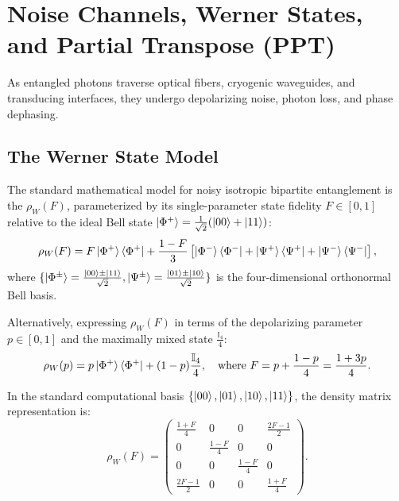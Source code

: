 \section{Noise Channels, Werner States, and Partial Transpose (PPT)}
\label{sec:werner_states}

As entangled photons traverse optical fibers, cryogenic waveguides, and transducing interfaces, they undergo depolarizing noise, photon loss, and phase dephasing.

\subsection{The Werner State Model}
The standard mathematical model for noisy isotropic bipartite entanglement is the  $\rho_W(F)$, parameterized by its single-parameter state fidelity $F \in [0, 1]$ relative to the ideal Bell state $\ket{\Phi^+} = \frac{1}{\sqrt{2}}(\ket{00} + \ket{11})$:
\begin{equation}
    \rho_W(F) = F \ket{\Phi^+}\bra{\Phi^+} + \frac{1 - F}{3} \left[ \ket{\Phi^-}\bra{\Phi^-} + \ket{\Psi^+}\bra{\Psi^+} + \ket{\Psi^-}\bra{\Psi^-} \right],
    \label{eq:werner_state_bell_basis}
\end{equation}
where $\{\ket{\Phi^\pm} = \frac{\ket{00}\pm\ket{11}}{\sqrt{2}}, \ket{\Psi^\pm} = \frac{\ket{01}\pm\ket{10}}{\sqrt{2}}\}$ is the four-dimensional orthonormal Bell basis.

Alternatively, expressing $\rho_W(F)$ in terms of the depolarizing parameter $p \in [0, 1]$ and the maximally mixed state $\frac{\mathbb{I}_4}{4}$:
\begin{equation}
    \rho_W(p) = p \ket{\Phi^+}\bra{\Phi^+} + (1 - p) \frac{\mathbb{I}_4}{4}, \quad \text{where } F = p + \frac{1 - p}{4} = \frac{1 + 3p}{4}.
    \label{eq:werner_state_depolarizing}
\end{equation}

In the standard computational basis $\{\ket{00}, \ket{01}, \ket{10}, \ket{11}\}$, the density matrix representation is:
\begin{equation}
    \rho_W(F) = \begin{pmatrix}
        \frac{1+F}{4} & 0 & 0 & \frac{2F-1}{2} \\
        0 & \frac{1-F}{4} & 0 & 0 \\
        0 & 0 & \frac{1-F}{4} & 0 \\
        \frac{2F-1}{2} & 0 & 0 & \frac{1+F}{4}
    \end{pmatrix}.
    \label{eq:werner_matrix_representation}
\end{equation}

